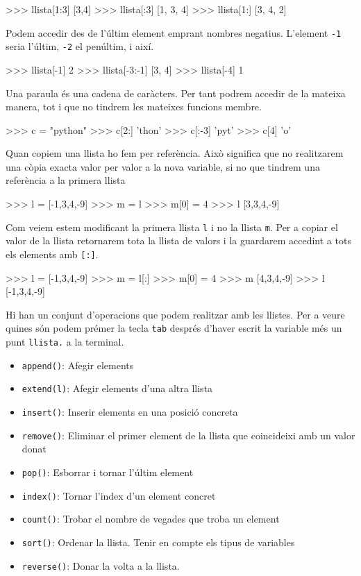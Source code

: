 \begin{blockcode}
>>> llista[1:3]
[3,4]
>>> llista[:3]
[1, 3, 4]
>>> llista[1:]
[3, 4, 2]
\end{blockcode}

Podem accedir des de l'últim element emprant nombres negatius. L'element {\tt -1} seria l'últim, {\tt -2} el penúltim, i així.


\begin{blockcode}
>>> llista[-1]
2
>>> llista[-3:-1]
[3, 4]
>>> llista[-4]
1
\end{blockcode}


Una paraula és una cadena de caràcters. Per tant podrem accedir de la mateixa manera, tot i que no tindrem les mateixes funcions membre.


\begin{blockcode}
>>> c = "python"
>>> c[2:]
'thon'
>>> c[:-3]
'pyt'
>>> c[4]
'o'
\end{blockcode}

Quan copiem una llista ho fem per referència. Això significa que no realitzarem una còpia exacta valor per valor a la nova variable, si no que tindrem una referència a la primera llista

\begin{blockcode}
>>> l = [-1,3,4,-9]
>>> m = l
>>> m[0] = 4
>>> l 
[3,3,4,-9]
\end{blockcode}

Com veiem estem modificant la primera llista {\tt l} i no la llista {\tt m}. Per a copiar el valor de la llista retornarem tota la llista de valors i la guardarem accedint a tots els elements amb {\tt [:]}.

\begin{blockcode}
>>> l = [-1,3,4,-9]
>>> m = l[:]
>>> m[0] = 4
>>> m
[4,3,4,-9]
>>> l
[-1,3,4,-9]
\end{blockcode}


Hi han un conjunt d'operacions que podem realitzar amb les llistes. Per a veure quines són podem prémer la tecla {\tt tab} després d'haver escrit la variable més un punt {\tt llista.} a la terminal.

\begin{itemize}
\item {\tt append()}: Afegir elements
\item {\tt extend(l)}: Afegir elements d'una altra llista
\item {\tt insert()}: Inserir elements en una posició concreta
\item {\tt remove()}: Eliminar el primer element de la llista que coincideixi amb un valor donat
\item {\tt pop()}: Esborrar i tornar l'últim element
\item {\tt index()}: Tornar l'index d'un element concret
\item {\tt count()}: Trobar el nombre de vegades que troba un element
\item {\tt sort()}: Ordenar la llista. Tenir en compte els tipus de variables
\item {\tt reverse()}: Donar la volta a la llista.
\end{itemize}



